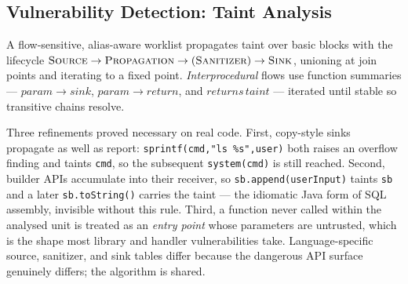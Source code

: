 \documentclass[10pt,conference]{IEEEtran}
\begin{document}
\subsection{Vulnerability Detection: Taint Analysis}
\label{sec:taint}
A flow-sensitive, alias-aware worklist propagates taint over basic blocks with
the lifecycle $\textsc{Source}\rightarrow\textsc{Propagation}\rightarrow
(\textsc{Sanitizer})\rightarrow\textsc{Sink}$, unioning at join points and
iterating to a fixed point. \emph{Interprocedural} flows use function
summaries --- $\mathit{param}\!\to\!\mathit{sink}$,
$\mathit{param}\!\to\!\mathit{return}$, and $\mathit{returns\,taint}$ ---
iterated until stable so transitive chains resolve.

Three refinements proved necessary on real code. First, copy-style sinks
propagate as well as report: \texttt{sprintf(cmd,"ls \%s",user)} both raises an
overflow finding and taints \texttt{cmd}, so the subsequent
\texttt{system(cmd)} is still reached. Second, builder APIs accumulate into
their receiver, so \texttt{sb.append(userInput)} taints \texttt{sb} and a later
\texttt{sb.toString()} carries the taint --- the idiomatic Java form of SQL
assembly, invisible without this rule. Third, a function never called within
the analysed unit is treated as an \emph{entry point} whose parameters are
untrusted, which is the shape most library and handler vulnerabilities take.
Language-specific source, sanitizer, and sink tables differ because the
dangerous API surface genuinely differs; the algorithm is shared.
\end{document}
